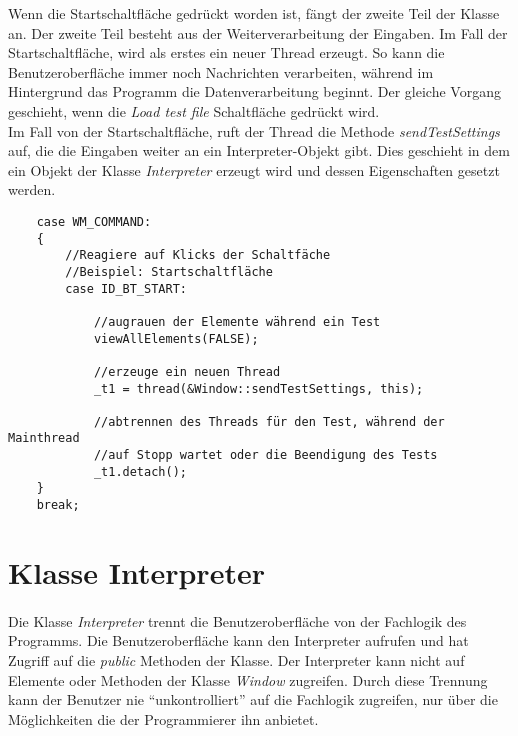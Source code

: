 Wenn die Startschaltfläche gedrückt worden ist, fängt der zweite Teil der Klasse an. Der zweite Teil besteht aus der Weiterverarbeitung der Eingaben. Im Fall der Startschaltfläche, wird als erstes ein neuer Thread erzeugt. So kann die Benutzeroberfläche immer noch Nachrichten verarbeiten, während im Hintergrund das Programm die Datenverarbeitung beginnt. Der gleiche Vorgang geschieht, wenn die \textit{Load test file} Schaltfläche gedrückt wird.\\

Im Fall von der Startschaltfläche, ruft der Thread die Methode \textit{sendTestSettings} auf, die die Eingaben weiter an ein Interpreter-Objekt gibt. Dies geschieht in dem ein Objekt der Klasse \textit{Interpreter} erzeugt wird und dessen Eigenschaften gesetzt werden.

\begin{lstlisting}	 
	case WM_COMMAND:
	{
		//Reagiere auf Klicks der Schaltfäche
		//Beispiel: Startschaltfläche
		case ID_BT_START:

			//augrauen der Elemente während ein Test
			viewAllElements(FALSE);

			//erzeuge ein neuen Thread
			_t1 = thread(&Window::sendTestSettings, this);

			//abtrennen des Threads für den Test, während der Mainthread
			//auf Stopp wartet oder die Beendigung des Tests
			_t1.detach();
	}
    break;
\end{lstlisting}




\newpage

\section{Klasse Interpreter}
\paragraph{}
Die Klasse \textit{Interpreter} trennt die Benutzeroberfläche von der Fachlogik des Programms. Die Benutzeroberfläche kann den Interpreter aufrufen und hat Zugriff auf die \textit{public} Methoden der Klasse. Der Interpreter kann nicht auf Elemente oder Methoden der Klasse \textit{Window} zugreifen. Durch diese Trennung kann der Benutzer nie "`unkontrolliert"' auf die Fachlogik zugreifen, nur über die Möglichkeiten die der Programmierer ihn anbietet.\\

